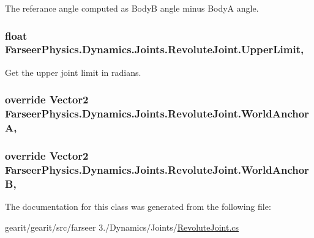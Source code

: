 The referance angle computed as Body\+B angle minus Body\+A angle. 

\hypertarget{class_farseer_physics_1_1_dynamics_1_1_joints_1_1_revolute_joint_a466ec9962a629cd64a455e0ceac6b0f4}{
\subsubsection[{Upper\+Limit}]{\setlength{\rightskip}{0pt plus 5cm}float Farseer\+Physics.\+Dynamics.\+Joints.\+Revolute\+Joint.\+Upper\+Limit\hspace{0.3cm}{\ttfamily [get]}, {\ttfamily [set]}}}\label{class_farseer_physics_1_1_dynamics_1_1_joints_1_1_revolute_joint_a466ec9962a629cd64a455e0ceac6b0f4}


Get the upper joint limit in radians. 

\hypertarget{class_farseer_physics_1_1_dynamics_1_1_joints_1_1_revolute_joint_abca3c0a8d61cf8aff63898df838b4fa4}{
\subsubsection[{World\+Anchor\+A}]{\setlength{\rightskip}{0pt plus 5cm}override Vector2 Farseer\+Physics.\+Dynamics.\+Joints.\+Revolute\+Joint.\+World\+Anchor\+A\hspace{0.3cm}{\ttfamily [get]}, {\ttfamily [set]}}}\label{class_farseer_physics_1_1_dynamics_1_1_joints_1_1_revolute_joint_abca3c0a8d61cf8aff63898df838b4fa4}
\hypertarget{class_farseer_physics_1_1_dynamics_1_1_joints_1_1_revolute_joint_a9f0de7928e71ca6fdd5dc8b7eef2ab9c}{
\subsubsection[{World\+Anchor\+B}]{\setlength{\rightskip}{0pt plus 5cm}override Vector2 Farseer\+Physics.\+Dynamics.\+Joints.\+Revolute\+Joint.\+World\+Anchor\+B\hspace{0.3cm}{\ttfamily [get]}, {\ttfamily [set]}}}\label{class_farseer_physics_1_1_dynamics_1_1_joints_1_1_revolute_joint_a9f0de7928e71ca6fdd5dc8b7eef2ab9c}


The documentation for this class was generated from the following file\+:\begin{DoxyCompactItemize}
\item 
gearit/gearit/src/farseer 3./\+Dynamics/\+Joints/\hyperlink{_revolute_joint_8cs}{Revolute\+Joint.\+cs}\end{DoxyCompactItemize}
